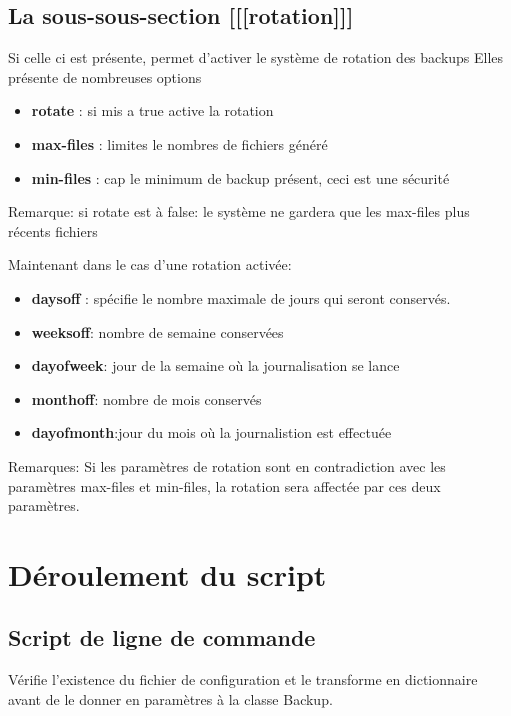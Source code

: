 \subsection*{La sous-sous-section [[[rotation]]]}
Si celle ci est présente, permet d'activer le système de rotation des backups
Elles présente de nombreuses options
\begin{itemize}
\item \textbf{rotate} : si mis a true active la rotation
\item \textbf{max-files} : limites le nombres de fichiers généré
\item \textbf{min-files} : cap le minimum de backup présent, ceci est une sécurité
\end{itemize}
Remarque: si rotate est à false: le système ne gardera que les max-files plus récents fichiers

Maintenant dans le cas d'une rotation activée:
\begin{itemize}
\item \textbf{daysoff} : spécifie le nombre maximale de jours qui seront conservés.
\item \textbf{weeksoff}: nombre de semaine conservées
\item \textbf{dayofweek}: jour de la semaine où la journalisation se lance
\item \textbf{monthoff}: nombre de mois conservés
\item \textbf{dayofmonth}:jour du mois où la journalistion est effectuée	
\end{itemize}

Remarques:
	Si les paramètres de rotation sont en contradiction avec les paramètres max-files et min-files,
la rotation sera affectée par ces deux paramètres. 


\section*{Déroulement du script}
\subsection*{Script de ligne de commande}
Vérifie l'existence du fichier de configuration et le transforme en dictionnaire avant de le donner en paramètres à la classe Backup.
